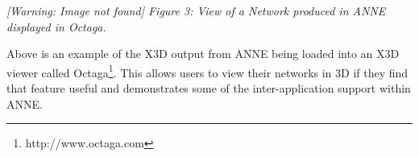 \documentclass[12pt,twoside]{article}
\begin{document}
\bigskip

{\upshape
}

\begin{center}
\begin{minipage}{10.06cm}
{\raggedleft\itshape
 [Warning: Image not found] Figure 3: View of a Network produced in ANNE
displayed in Octaga.
\par}
\end{minipage}\end{center}
{\upshape
Above is an example of the X3D output from ANNE being loaded into an X3D
viewer called Octaga\footnote{http://www.octaga.com}. This allows users
to view their networks in 3D if they find that feature useful and
demonstrates some of the inter{}-application support within ANNE.}


\bigskip
\end{document}
